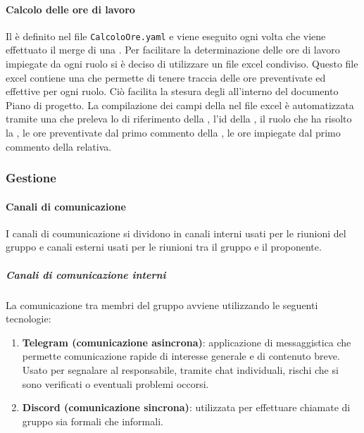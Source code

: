 \paragraph{Calcolo delle ore di lavoro}
\label{par:calcolo_ore_lavoro}
Il  è definito nel file \texttt{CalcoloOre.yaml} e viene eseguito ogni volta che viene effettuato il merge di una .
Per facilitare la determinazione delle ore di lavoro impiegate da ogni ruolo si è deciso di utilizzare un file excel condiviso.
Questo file excel contiene una  che permette di tenere traccia delle ore preventivate ed effettive per ogni ruolo.
Ciò facilita la stesura degli  all'interno del documento Piano di progetto.
La compilazione dei campi della  nel file excel è automatizzata tramite una  che preleva lo  di riferimento della ,
l'id della , il ruolo che ha risolto la , le ore preventivate dal primo commento della , le ore impiegate dal primo commento della  relativa.

\subsubsection{Gestione}
\paragraph{Canali di comunicazione}
I canali di coumunicazione si dividono in canali interni usati per le riunioni del gruppo e canali esterni usati per le riunioni tra il gruppo e il proponente.

\subparagraph{Canali di comunicazione interni}
\label{subpar:canali_interni}
La comunicazione tra membri del gruppo avviene utilizzando le seguenti tecnologie:
\begin{enumerate}
    \item \textbf{Telegram (comunicazione asincrona)}: applicazione di messaggistica che permette comunicazione rapide di interesse generale e di contenuto breve.
    Usato per segnalare al responsabile, tramite chat individuali, rischi che si sono verificati o eventuali problemi occorsi.

    \item \textbf{Discord (comunicazione sincrona)}: utilizzata per effettuare chiamate di gruppo sia formali che informali.
\end{enumerate}

